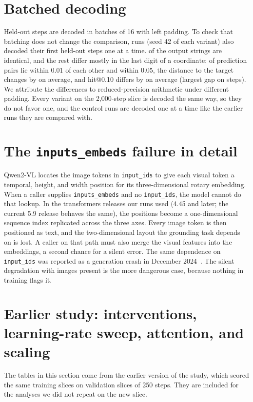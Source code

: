 \documentclass[letterpaper]{article} %
\makeatletter
\newcommand{\hitat}[1]{hit@#1}
\makeatother
\begin{document}


\section{Batched decoding}
\label{app:batch}
Held-out steps are decoded in batches of 16 with left padding. To check that batching does not change the comparison, \nBatchRuns{} runs (seed 42 of each variant) also decoded their first \nBatchK{} held-out steps one at a time. \nBatchIdent{} of the output strings are identical, and the rest differ mostly in the last digit of a coordinate: \nBatchNearOne{} of prediction pairs lie within 0.01 of each other and \nBatchNearFive{} within 0.05, the distance to the target changes by \nBatchDist{} on average, and \hitat{0.10} differs by \nBatchMeanGap{} on average (largest gap \nBatchGap{} on \nBatchK{} steps). We attribute the differences to reduced-precision arithmetic under different padding. Every variant on the 2,000-step slice is decoded the same way, so they do not favor one, and the control runs are decoded one at a time like the earlier runs they are compared with.

\section{The \texttt{inputs\_embeds} failure in detail}
\label{app:mrope}
Qwen2-VL locates the image tokens in \texttt{input\_ids} to give each visual token a temporal, height, and width position for its three-dimensional rotary embedding. When a caller supplies \texttt{inputs\_embeds} and no \texttt{input\_ids}, the model cannot do that lookup. In the transformers releases our runs used (4.45 and later; the current 5.9 release behaves the same), the positions become a one-dimensional sequence index replicated across the three axes. Every image token is then positioned as text, and the two-dimensional layout the grounding task depends on is lost. A caller on that path must also merge the visual features into the embeddings, a second chance for a silent error. The same dependence on \texttt{input\_ids} was reported as a generation crash in December 2024~\citep{hfissue35463}. The silent degradation with images present is the more dangerous case, because nothing in training flags it.

\section{Earlier study: interventions, learning-rate sweep, attention, and scaling}
\label{app:legacy}
The tables in this section come from the earlier version of the study, which scored the same training slices on validation slices of 250 steps. They are included for the analyses we did not repeat on the new slice.
\end{document}
